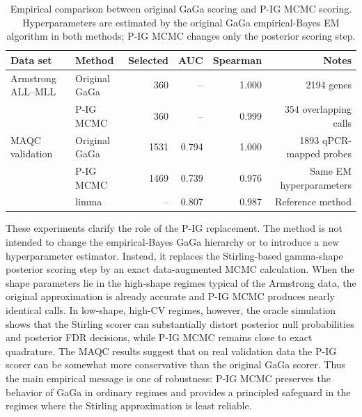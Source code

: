 \begin{table}[t]
\centering
\caption{Empirical comparison between original GaGa scoring and P-IG MCMC
scoring.  Hyperparameters are estimated by the original GaGa empirical-Bayes
EM algorithm in both methods; P-IG MCMC changes only the posterior scoring
step.}
\label{tab:gaga-empirical}
\smallskip
\renewcommand{\arraystretch}{1.12}
\setlength{\tabcolsep}{5pt}
{\footnotesize
\begin{tabular}{@{}llrrrr@{}}
\toprule
\textbf{Data set} & \textbf{Method} & \textbf{Selected} &
\textbf{AUC} & \textbf{Spearman} & \textbf{Notes} \\
\midrule
Armstrong ALL--MLL & Original GaGa & 360 & -- & 1.000 & 2194 genes \\
                   & P-IG MCMC & 360 & -- & 0.999 & 354 overlapping calls \\
\midrule
MAQC validation & Original GaGa & 1531 & 0.794 & 1.000 & 1893 qPCR-mapped probes \\
                & P-IG MCMC & 1469 & 0.739 & 0.976 & Same EM hyperparameters \\
                & limma & -- & 0.807 & 0.987 & Reference method \\
\bottomrule
\end{tabular}}
\end{table}

These experiments clarify the role of the P-IG replacement.  The method is not
intended to change the empirical-Bayes GaGa hierarchy or to introduce a new
hyperparameter estimator.  Instead, it replaces the Stirling-based gamma-shape
posterior scoring step by an exact data-augmented MCMC calculation.  When the
shape parameters lie in the high-shape regimes typical of the Armstrong data,
the original approximation is already accurate and P-IG MCMC produces nearly
identical calls.  In low-shape, high-CV regimes, however, the oracle simulation
shows that the Stirling scorer can substantially distort posterior null
probabilities and posterior FDR decisions, while P-IG MCMC remains close to
exact quadrature.  The MAQC results suggest that on real validation data the
P-IG scorer can be somewhat more conservative than the original GaGa scorer.
Thus the main empirical message is one of robustness: P-IG MCMC preserves the
behavior of GaGa in ordinary regimes and provides a principled safeguard in
the regimes where the Stirling approximation is least reliable.
